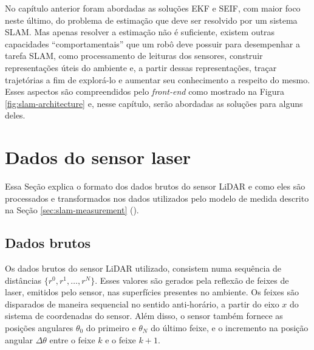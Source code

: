 No capítulo anterior foram abordadas as soluções EKF e SEIF, com maior 
foco neste último, do problema de estimação que deve ser resolvido por um 
sistema SLAM. Mas apenas resolver a estimação não é suficiente, existem 
outras capacidades ``comportamentais'' que um robô deve possuir para 
desempenhar a tarefa SLAM, como processamento de leituras dos sensores, construir 
representações úteis do ambiente e, a partir dessas representações, traçar 
trajetórias a fim de explorá-lo e aumentar seu conhecimento a respeito 
do mesmo. Esses aspectos são compreendidos pelo \textit{front-end} 
como mostrado na Figura \ref{fig:slam-architecture} e, nesse capítulo, serão abordadas as soluções para alguns deles.

\section{Dados do sensor laser}
Essa Seção explica o formato dos dados brutos do sensor LiDAR e como eles 
são processados e transformados nos dados utilizados pelo modelo de medida 
descrito na Seção \ref{sec:slam-measurement} ().

\subsection{Dados brutos}
Os dados brutos do sensor LiDAR utilizado, consistem numa sequência de 
distâncias $\{r^0, r^1, \dots, r^N\}$. Esses valores são gerados pela reflexão de feixes de laser, emitidos pelo sensor, nas superfícies 
presentes no ambiente. Os feixes são disparados de maneira sequencial no 
sentido anti-horário, a partir do eixo $x$ do sistema de coordenadas do sensor. 
Além disso, o sensor também fornece as posições angulares $\theta_0$ 
do primeiro e $\theta_N$ do último feixe, e o incremento na posição angular $\Delta \theta$ entre o feixe $k$ e o feixe $k+1$.

